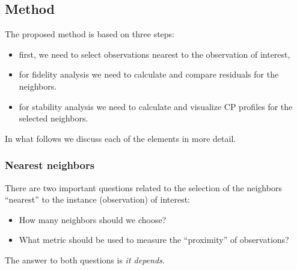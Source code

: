 \documentclass[12pt,]{krantz}
\providecommand{\tightlist}{%
  \setlength{\itemsep}{0pt}\setlength{\parskip}{0pt}}
\begin{document}
\hypertarget{cPLocDiagMethod}{%
\subsection{Method}\label{cPLocDiagMethod}}

The proposed method is based on three steps:

\begin{itemize}
\tightlist
\item
  first, we need to select observations nearest to the observation of interest,
\item
  for fidelity analysis we need to calculate and compare residuals for the neighbors.
\item
  for stability analysis we need to calculate and visualize CP profiles for the selected neighbors.
\end{itemize}

In what follows we discuss each of the elements in more detail.

\hypertarget{cPLocDiagNeighbors}{%
\subsubsection{Nearest neighbors}\label{cPLocDiagNeighbors}}

There are two important questions related to the selection of the neighbors ``nearest'' to the instance (observation) of interest:

\begin{itemize}
\tightlist
\item
  How many neighbors should we choose?
\item
  What metric should be used to measure the ``proximity'' of observations?
\end{itemize}

The answer to both questions is \emph{it depends}.
\end{document}
